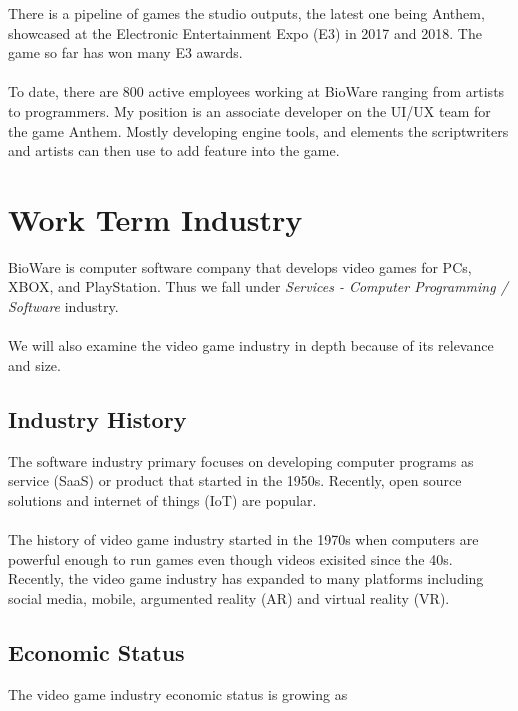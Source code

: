 \documentclass[10pt,letterpaper]{article}
\begin{document}
There is a pipeline of games the studio outputs, the latest one being Anthem, showcased at the Electronic Entertainment Expo (E3) in 2017 and 2018. The game so far has won many E3 awards.\\
\\
To date, there are 800 active employees working at BioWare ranging from artists to programmers. My position is an associate developer on the UI/UX team for the game Anthem. Mostly developing engine tools, and elements the scriptwriters and artists can then use to add feature into the game. \\

\section{Work Term Industry}\label{work-term-industry}

BioWare is computer software company that develops video games for PCs, XBOX, and PlayStation. Thus we fall under \textit{Services - Computer Programming / Software} industry.\\
\\
We will also examine the video game industry in depth because of its relevance and size. \\

\subsection{Industry History}

The software industry primary focuses on developing computer programs as service (SaaS) or product that started in the 1950s. Recently, open source solutions and internet of things (IoT) are popular.\cite{software-industry}\\
\\
The history of video game industry started in the 1970s when computers are powerful enough to run games even though videos exisited since the 40s. Recently, the video game industry has expanded to many platforms including social media, mobile, argumented reality (AR) and virtual reality (VR).\cite{video-game-industry-wiki}\cite{video-game-industry-stats}\\

\subsection{Economic Status}

The video game industry economic status is growing as 
\end{document}
